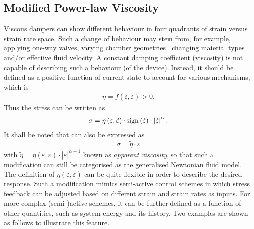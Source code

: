 \subsection{Modified Power-law Viscosity}
Viscous dampers can show different behaviour in four quadrants of strain versus strain rate space. Such a change of behaviour may stem from, for example, applying one-way valves, varying chamber geometries \citep{Hazaveh2017}, changing material types \citep{Lu2018} and/or effective fluid velocity. A constant damping coefficient (viscosity) is not capable of describing such a behaviour (of the device). Instead, it should be defined as a positive function of current state to account for various mechanisms, which is
\begin{gather}
\eta=f\left(\varepsilon,\dot\varepsilon\right)>0.
\end{gather}
Thus the stress can be written as
\begin{gather}\label{eq:quadrant_damper_govern}
\sigma=\eta\left(\varepsilon,\dot\varepsilon\right)\cdot\mathrm{sign}\left(\dot{\varepsilon}\right)\cdot\left\lvert\dot{\varepsilon}\right\rvert^{\alpha}.
\end{gather}
It shall be noted that  can also be expressed as
\begin{gather}
\sigma=\tilde{\eta}\cdot\dot{\varepsilon}
\end{gather}
with $\tilde{\eta}=\eta\left(\varepsilon,\dot\varepsilon\right)\cdot\left\lvert\dot{\varepsilon}\right\rvert^{\alpha-1}$ known as \textit{apparent viscosity}, so that such a modification can still be categorised as the generalised Newtonian fluid model.
The definition of $\eta\left(\varepsilon,\dot\varepsilon\right)$ can be quite flexible in order to describe the desired response. Such a modification mimics semi-active control schemes in which stress feedback can be adjusted based on different strain and strain rates as inputs. For more complex (semi-)active schemes, it can be further defined as a function of other quantities, such as system energy and its history. Two examples are shown as follows to illustrate this feature.

